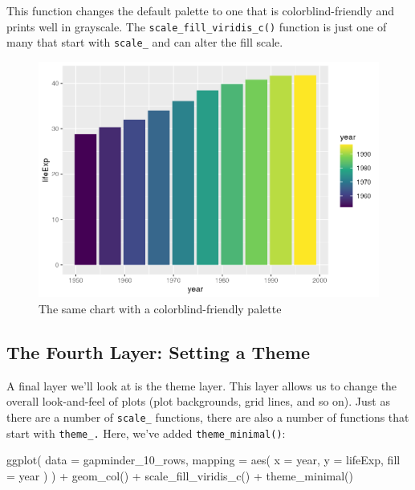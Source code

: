 \documentclass[
]{book}
\newenvironment{Shaded}{\begin{snugshade}}{\end{snugshade}}
\newcommand{\AttributeTok}[1]{\textcolor[rgb]{0.77,0.63,0.00}{#1}}
\newcommand{\FunctionTok}[1]{\textcolor[rgb]{0.00,0.00,0.00}{#1}}
\newcommand{\NormalTok}[1]{#1}
\newcommand{\SpecialCharTok}[1]{\textcolor[rgb]{0.00,0.00,0.00}{#1}}
\begin{document}
This function changes the default palette to one that is colorblind-friendly and prints well in grayscale. The \texttt{scale\_fill\_viridis\_c()} function is just one of many that start with \texttt{scale\_} and can alter the fill scale.

\begin{figure}
\includegraphics[width=1\linewidth]{data-viz_files/figure-latex/gapminder-viridis-plot-1} \caption{The same chart with a colorblind-friendly palette}\label{fig:gapminder-viridis-plot}
\end{figure}

\hypertarget{the-fourth-layer-setting-a-theme}{%
\subsection*{The Fourth Layer: Setting a Theme}\label{the-fourth-layer-setting-a-theme}}

A final layer we'll look at is the theme layer. This layer allows us to change the overall look-and-feel of plots (plot backgrounds, grid lines, and so on). Just as there are a number of \texttt{scale\_} functions, there are also a number of functions that start with \texttt{theme\_.} Here, we've added \texttt{theme\_minimal()}:

\begin{Shaded}
\begin{Highlighting}[]
\FunctionTok{ggplot}\NormalTok{(}
  \AttributeTok{data =}\NormalTok{ gapminder\_10\_rows,}
  \AttributeTok{mapping =} \FunctionTok{aes}\NormalTok{(}
    \AttributeTok{x =}\NormalTok{ year,}
    \AttributeTok{y =}\NormalTok{ lifeExp,}
    \AttributeTok{fill =}\NormalTok{ year}
\NormalTok{  )}
\NormalTok{) }\SpecialCharTok{+}
  \FunctionTok{geom\_col}\NormalTok{() }\SpecialCharTok{+}
  \FunctionTok{scale\_fill\_viridis\_c}\NormalTok{() }\SpecialCharTok{+}
  \FunctionTok{theme\_minimal}\NormalTok{()}
\end{Highlighting}
\end{Shaded}
\end{document}
